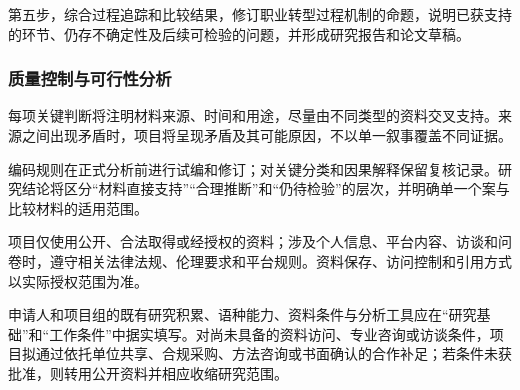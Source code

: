 第五步，综合过程追踪和比较结果，修订职业转型过程机制的命题，说明已获支持的环节、仍存不确定性及后续可检验的问题，并形成研究报告和论文草稿。

\subsubsection{质量控制与可行性分析}

每项关键判断将注明材料来源、时间和用途，尽量由不同类型的资料交叉支持。来源之间出现矛盾时，项目将呈现矛盾及其可能原因，不以单一叙事覆盖不同证据。

编码规则在正式分析前进行试编和修订；对关键分类和因果解释保留复核记录。研究结论将区分“材料直接支持”“合理推断”和“仍待检验”的层次，并明确单一个案与比较材料的适用范围。

项目仅使用公开、合法取得或经授权的资料；涉及个人信息、平台内容、访谈和问卷时，遵守相关法律法规、伦理要求和平台规则。资料保存、访问控制和引用方式以实际授权范围为准。

申请人和项目组的既有研究积累、语种能力、资料条件与分析工具应在“研究基础”和“工作条件”中据实填写。对尚未具备的资料访问、专业咨询或访谈条件，项目拟通过依托单位共享、合规采购、方法咨询或书面确认的合作补足；若条件未获批准，则转用公开资料并相应收缩研究范围。

